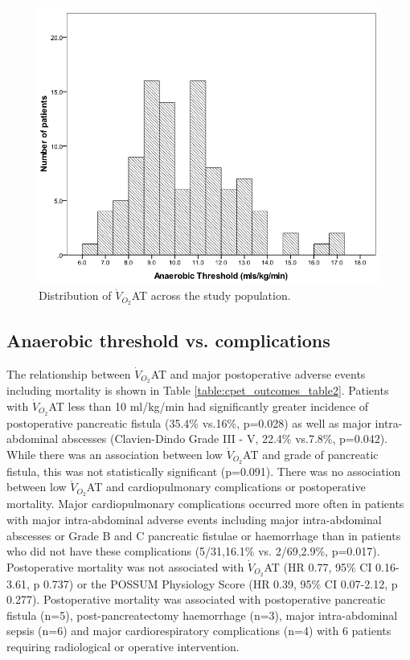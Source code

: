 \begin{figure}[p]
	\centering
	\includegraphics[width=\textwidth]{Figures/cpet_outcomes_dist_of_AT}
	\caption{Distribution of $\dot{V}_{O_2}$AT across the study population.}
	\label{fig:cpet_outcomes_dist_of_AT}
\end{figure}

\subsection{Anaerobic threshold vs. complications}
The relationship between $\dot{V}_{O_2}$AT and major postoperative adverse events including mortality is shown in Table \ref{table:cpet_outcomes_table2}. 
Patients with $\dot{V}_{O_2}$AT less than 10 ml/kg/min had significantly greater incidence of postoperative pancreatic fistula (35.4\% vs.16\%, p=0.028) as well as major intra-abdominal abscesses (Clavien-Dindo Grade III - V, 22.4\% vs.7.8\%, p=0.042). 
While there was an association between low $\dot{V}_{O_2}$AT and grade of pancreatic fistula, this was not statistically significant (p=0.091). 
There was no association between low $\dot{V}_{O_2}$AT and cardiopulmonary complications or postoperative mortality. 
Major cardiopulmonary complications occurred more often in patients with major intra-abdominal adverse events including major intra-abdominal abscesses or Grade B and C pancreatic fistulae or haemorrhage than in patients who did not have these complications (5/31,16.1\% vs. 2/69,2.9\%, p=0.017). 
Postoperative mortality was not associated with $\dot{V}_{O_2}$AT (HR 0.77, 95\% CI 0.16-3.61, p 0.737) or the POSSUM Physiology Score (HR 0.39, 95\% CI 0.07-2.12, p 0.277). 
Postoperative mortality was associated with postoperative pancreatic fistula (n=5), post-pancreatectomy haemorrhage (n=3), major intra-abdominal sepsis (n=6) and major cardiorespiratory complications (n=4) with 6 patients requiring radiological or operative intervention.

